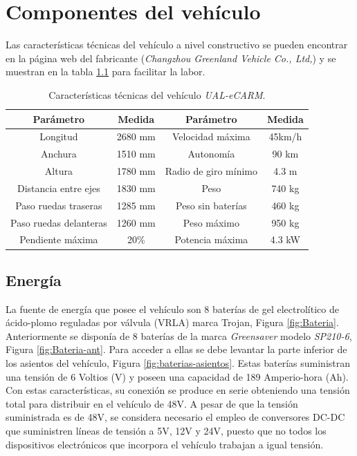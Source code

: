 \chapter{Componentes del vehículo}
Las características técnicas del vehículo a nivel constructivo se pueden encontrar en la página web del fabricante \cite{Greenland} (\textit{Changzhou Greenland Vehicle Co., Ltd,}) y se muestran en la tabla \ref{Tab:medidas_UALeCARM} para facilitar la labor.

\begin{table}[H]
\caption{Características técnicas del vehículo \textit{UAL-eCARM}.}\label{Tab:medidas_UALeCARM}
\centering
\begin{tabular}{|c |c |c |c|}
\hline %
Parámetro & Medida & Parámetro & Medida \\
\hline
Longitud & 2680 mm  &  Velocidad máxima &  45km/h  \\
\hline
Anchura &  1510 mm  & Autonomía & 90 km \\
\hline
Altura & 1780 mm  & Radio de giro mínimo & 4.3 m \\
\hline
Distancia entre ejes &  1830 mm  & Peso & 740 kg \\
\hline
Paso ruedas traseras & 1285 mm  & Peso sin baterías &  460 kg \\
\hline
Paso ruedas delanteras & 1260 mm  &  Peso máximo &  950 kg \\
\hline
Pendiente máxima &  20\% &  Potencia máxima & 4.3 kW \\
\hline
\end{tabular}
\end{table}

\section{Energía}
La fuente de energía que posee el vehículo son 8 baterías de gel electrolítico de ácido-plomo reguladas por válvula (VRLA) marca Trojan, Figura \ref{fig:Bateria}. Anteriormente se disponía de 8 baterías de la marca \textit{Greensaver} modelo \textit{SP210-6}, Figura \ref{fig:Bateria-ant}. Para acceder a ellas se debe levantar la parte inferior de los asientos del vehículo, Figura \ref{fig:baterias-asientos}. Estas baterías suministran una tensión de 6 Voltios (V) y poseen una capacidad de 189 Amperio-hora (Ah). Con estas características, su conexión se produce en serie obteniendo una tensión total para distribuir en el vehículo de 48V. A pesar de que la tensión suministrada es de 48V, se considera necesario el empleo de conversores DC-DC que suministren líneas de tensión a 5V, 12V y 24V, puesto que no todos los dispositivos electrónicos que incorpora el vehículo trabajan a igual tensión.

